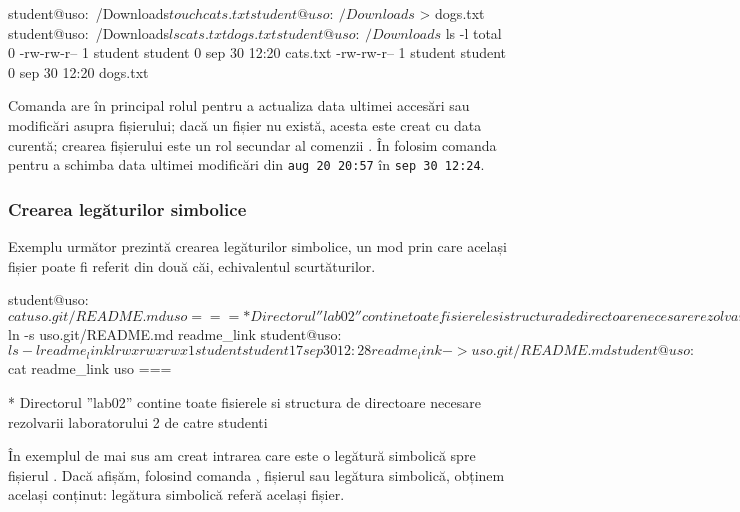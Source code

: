 \begin{screen}[caption={Crearea unui fișier},label={lst:fs:create-file}]
student@uso:~/Downloads$ touch cats.txt
student@uso:~/Downloads$ > dogs.txt
student@uso:~/Downloads$ ls
cats.txt  dogs.txt
student@uso:~/Downloads$ ls -l
total 0
-rw-rw-r-- 1 student student 0 sep 30 12:20 cats.txt
-rw-rw-r-- 1 student student 0 sep 30 12:20 dogs.txt
\end{screen}

Comanda  are în principal rolul pentru a actualiza data ultimei accesări sau modificări asupra fișierului;
dacă un fișier nu există, acesta este creat cu data curentă;
crearea fișierului este un rol secundar al comenzii .
În  folosim comanda  pentru a schimba data ultimei modificări din \texttt{aug 20 20:57} în \texttt{sep 30 12:24}.


\subsubsection{Crearea legăturilor simbolice}
\label{sec:fs:link}

Exemplu următor prezintă crearea legăturilor simbolice, un mod prin care același fișier poate fi referit din două căi, echivalentul scurtăturilor.

\begin{screen}
student@uso:~$ cat uso.git/README.md
uso
===

   * Directorul ''lab02'' contine toate fisierele si structura de directoare necesare rezolvarii laboratorului 2 de catre studenti
student@uso:~$ ln -s uso.git/README.md readme_link
student@uso:~$ ls -l readme_link
lrwxrwxrwx 1 student student 17 sep 30 12:28 readme_link -> uso.git/README.md
student@uso:~$ cat readme_link
uso
===

   * Directorul ''lab02'' contine toate fisierele si structura de directoare necesare rezolvarii laboratorului 2 de catre studenti
\end{screen}

În exemplul de mai sus am creat intrarea  care este o legătură simbolică spre fișierul .
Dacă afișăm, folosind comanda , fișierul sau legătura simbolică, obținem același conținut: legătura simbolică referă același fișier.

